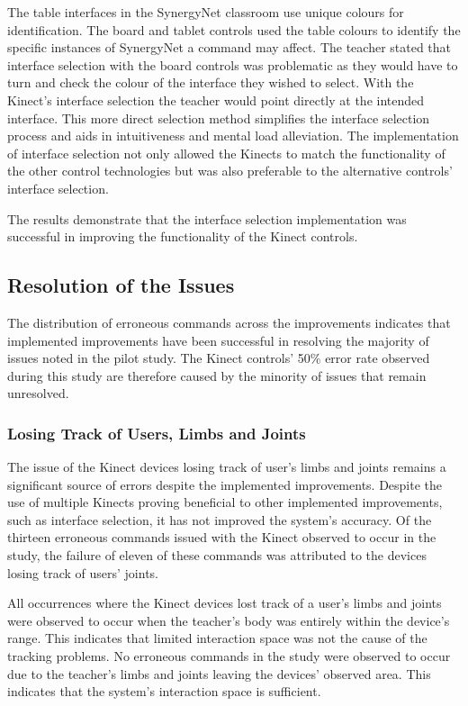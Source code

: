 \documentclass[link]{IWCOMP}
\begin{document}
The table interfaces in the SynergyNet classroom use unique colours for identification.
The board and tablet controls used the table colours to identify the specific instances of SynergyNet a command may affect.
The teacher stated that interface selection with the board controls was problematic as they would have to turn and check the colour of the interface they wished to select.
With the Kinect's interface selection the teacher would point directly at the intended interface.
This more direct selection method simplifies the interface selection process and aids in intuitiveness and mental load alleviation.
The implementation of interface selection not only allowed the Kinects to match the functionality of the other control technologies but was also preferable to the alternative controls' interface selection.

The results demonstrate that the interface selection implementation was successful in improving the functionality of the Kinect controls.

\subsection{Resolution of the Issues}
\label{subsec:discussionResolution}

The distribution of erroneous commands across the improvements indicates that implemented improvements have been successful in resolving the majority of issues noted in the pilot study.
The Kinect controls' 50\% error rate observed during this study are therefore caused by the minority of issues that remain unresolved.

\subsubsection{Losing Track of Users, Limbs and Joints}
\label{subsubsec:discussionResolutionLosingTrack}

The issue of the Kinect devices losing track of user's limbs and joints remains a significant source of errors despite the implemented improvements.
Despite the use of multiple Kinects proving beneficial to other implemented improvements, such as interface selection, it has not improved the system's accuracy.
Of the thirteen erroneous commands issued with the Kinect observed to occur in the study, the failure of eleven of these commands was attributed to the devices losing track of users' joints.

All occurrences where the Kinect devices lost track of a user's limbs and joints were observed to occur when the teacher's body was entirely within the device's range.
This indicates that limited interaction space was not the cause of the tracking problems.
No erroneous commands in the study were observed to occur due to the teacher's limbs and joints leaving the devices' observed area.
This indicates that the system's interaction space is sufficient.
\end{document}
